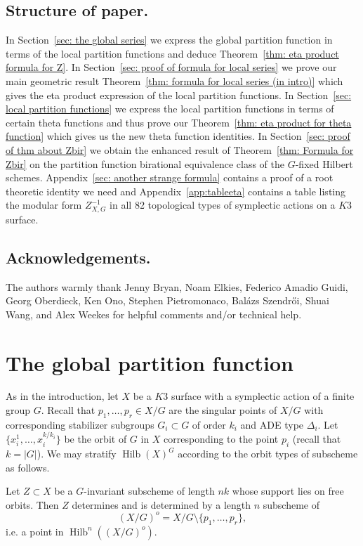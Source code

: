 \documentclass{amsart}
\theoremstyle{definition}
\newcommand{\Hilb}{\operatorname{Hilb}}
\begin{document}
\subsection{Structure of paper. }  In Section~\ref{sec: the global
series} we express the global partition function in terms of the local
partition functions and deduce Theorem~\ref{thm: eta product formula
for Z}. In Section~\ref{sec: proof of formula for local series} we
prove our main geometric result Theorem~\ref{thm: formula for local
series (in intro)} which gives the eta product expression of the local
partition functions. In Section~\ref{sec: local partition functions}
we express the local partition functions in terms of certain theta
functions and thus prove our Theorem~\ref{thm: eta product for theta
function} which gives us the new theta function identities. In
Section~\ref{sec: proof of thm about Zbir} we obtain the enhanced
result of Theorem~\ref{thm: Formula for Zbir} on the partition
function birational equivalence class of the $G$-fixed Hilbert
schemes. Appendix~\ref{sec: another strange formula} contains a proof
of a root theoretic identity we need and Appendix~\ref{app:tableeta}
contains a table listing the modular form $Z^{-1}_{X,G}$ in all 82
topological types of symplectic actions on a $K3$ surface.


\subsection{Acknowledgements.} The authors warmly thank Jenny Bryan,
Noam Elkies, Federico Amadio Guidi, Georg Oberdieck, Ken Ono, Stephen
Pietromonaco, Bal\'azs Szendr\H{o}i, Shuai Wang, and Alex Weekes for
helpful comments and/or technical help.


\section{The global partition function}\label{sec: the global series}

As in the introduction, let $X$ be a $K3$ surface with a symplectic
action of a finite group $G$.  Recall that $p_{1},\dotsc ,p_{r}\in
X/G$ are the singular points of $X/G$ with corresponding stabilizer
subgroups $G_{i}\subset G$ of order $k_{i}$ and ADE type
$\Delta_{i}$. Let $\{x_{i}^{1},\dotsc ,x_{i}^{k/k_{i}} \}$ be the
orbit of $G$ in $X$ corresponding to the point $p_{i}$ (recall that
$k=|G|$).  We may stratify $\Hilb (X)^{G}$ according to the orbit
types of subscheme as follows.

Let $Z\subset X$ be a $G$-invariant subscheme of length $nk$ whose
support lies on free orbits. Then $Z$ determines and is determined by
a length $n$ subscheme of 
\[
(X/G)^{o}  = X/G\setminus \{p_{1},\dotsc ,p_{r} \},
\]
i.e. a point
in $\Hilb^{n}((X/G)^{o})$.
\end{document}
